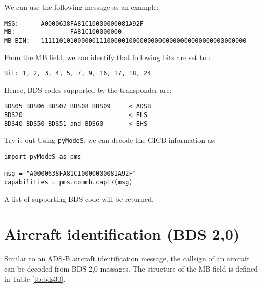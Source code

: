 We can use the following message as an example:

\begin{verbatim}
MSG:      A0000638FA81C10000000081A92F
MB:               FA81C100000000
MB BIN:   11111010100000011100000100000000000000000000000000000000
\end{verbatim}

From the MB field, we can identify that following bits are set to \1:

\begin{verbatim}
Bit: 1, 2, 3, 4, 5, 7, 9, 16, 17, 18, 24
\end{verbatim}

Hence, BDS codes supported by the transponder are: 
\begin{verbatim}
BDS05 BDS06 BDS07 BDS08 BDS09     < ADSB
BDS20                             < ELS
BDS40 BDS50 BDS51 and BDS60       < EHS
\end{verbatim}
  
\begin{notebox}{Try it out}
Using \texttt{pyModeS}, we can decode the GICB information as: 

\begin{verbatim}
import pyModeS as pms

msg = "A0000638FA81C10000000081A92F"
capabilities = pms.commb.cap17(msg)
\end{verbatim}

A list of supporting BDS code will be returned.

\end{notebox}

\newpage


\section{Aircraft identification (BDS 2,0)}

Similar to an ADS-B aircraft identification message, the callsign of an aircraft can be decoded from BDS 2,0 messages. The structure of the MB field is defined in Table \ref{tb:bds30}.

